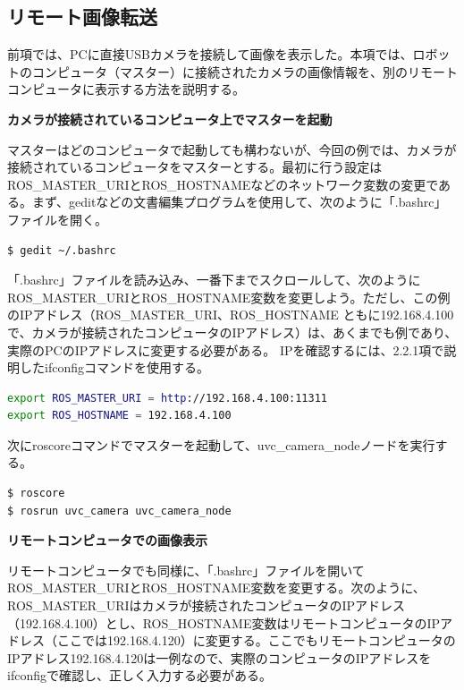 \subsection{リモート画像転送}

前項では、PCに直接USBカメラを接続して画像を表示した。本項では、ロボットのコンピュータ（マスター）に接続されたカメラの画像情報を、別のリモートコンピュータに表示する方法を説明する。

\textbf{カメラが接続されているコンピュータ上でマスターを起動}

マスターはどのコンピュータで起動しても構わないが、今回の例では、カメラが接続されているコンピュータをマスターとする。最初に行う設定はROS\_MASTER\_URIとROS\_HOSTNAMEなどのネットワーク変数の変更である。まず、geditなどの文書編集プログラムを使用して、次のように「.bashrc」ファイルを開く。

\begin{lstlisting}[language=ROS]
$ gedit ~/.bashrc
\end{lstlisting}

「.bashrc」ファイルを読み込み、一番下までスクロールして、次のようにROS\_MASTER\_URIとROS\_HOSTNAME変数を変更しよう。ただし、この例のIPアドレス（ROS\_MASTER\_URI、ROS\_HOSTNAME ともに192.168.4.100で、カメラが接続されたコンピュータのIPアドレス）は、あくまでも例であり、実際のPCのIPアドレスに変更する必要がある。 IPを確認するには、2.2.1項で説明したifconfigコマンドを使用する。

\begin{lstlisting}[language=bash]
export ROS_MASTER_URI = http://192.168.4.100:11311
export ROS_HOSTNAME = 192.168.4.100
\end{lstlisting}

次にroscoreコマンドでマスターを起動して、uvc\_camera\_nodeノードを実行する。

\begin{lstlisting}[language=ROS]
$ roscore
$ rosrun uvc_camera uvc_camera_node
\end{lstlisting}

\textbf{リモートコンピュータでの画像表示}

リモートコンピュータでも同様に、「.bashrc」ファイルを開いてROS\_MASTER\_URIとROS\_HOSTNAME変数を変更する。次のように、ROS\_MASTER\_URIはカメラが接続されたコンピュータのIPアドレス（192.168.4.100）とし、ROS\_HOSTNAME変数はリモートコンピュータのIPアドレス（ここでは192.168.4.120）に変更する。ここでもリモートコンピュータのIPアドレス192.168.4.120は一例なので、実際のコンピュータのIPアドレスをifconfigで確認し、正しく入力する必要がある。


